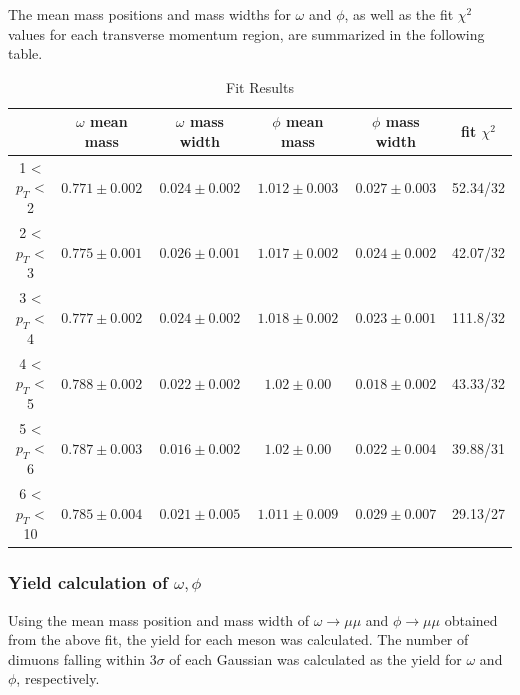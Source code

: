                 The mean mass positions and mass widths for $\omega$ and $\phi$, as well as the fit $\chi^2$ values for each transverse momentum region, are summarized in the following table.
                    \begin{table}[htbp]
                        \centering
                        \caption{Fit Results}
                        \begin{tabular}{|c||c|c|c|c|c|}
                            \hline
                            & $\omega$ mean mass & $\omega$ mass width & $\phi$ mean mass & $\phi$ mass width & fit $\chi^2$ \\ \hline \hline
                            1 < $p_{T}$ < 2 &$0.771\pm0.002$& $0.024\pm0.002$ &$1.012\pm0.003$ &$0.027\pm 0.003$ & 52.34/32\\ \hline
                            2 < $p_{T}$ < 3 &$0.775\pm0.001$&$0.026\pm0.001$ & $1.017\pm0.002$& $0.024\pm 0.002$ & 42.07/32\\ \hline
                            3 < $p_{T}$ < 4 &$0.777\pm0.002$& $0.024\pm0.002$ &$1.018\pm0.002$ &$0.023\pm 0.001$ & 111.8/32\\ \hline
                            4 < $p_{T}$ < 5 &$0.788\pm0.002$& $0.022\pm0.002$ &$1.02\pm0.00$ &$0.018\pm 0.002$ & 43.33/32\\ \hline
                            5 < $p_{T}$ < 6 &$0.787\pm0.003$& $0.016\pm0.002$ &$1.02\pm0.00$ &$0.022\pm 0.004$ & 39.88/31\\ \hline
                            6 < $p_{T}$ < 10 &$0.785\pm0.004$& $0.021\pm0.005$ &$1.011\pm0.009$ &$0.029\pm 0.007$ & 29.13/27\\ \hline
                        \end{tabular}
                        \label{Analysis:Dimuon:Yield:Fit_Results}
                    \end{table}
                    \subsubsection{Yield calculation of $\omega,\phi$} 
                    Using the mean mass position and mass width of $\omega \rightarrow \mu\mu$ and $\phi \rightarrow \mu\mu$ obtained from the above fit, the yield for each meson was calculated. The number of dimuons falling within 3$\sigma$ of each Gaussian was calculated as the yield for $\omega$ and $\phi$, respectively.
                \newpage
